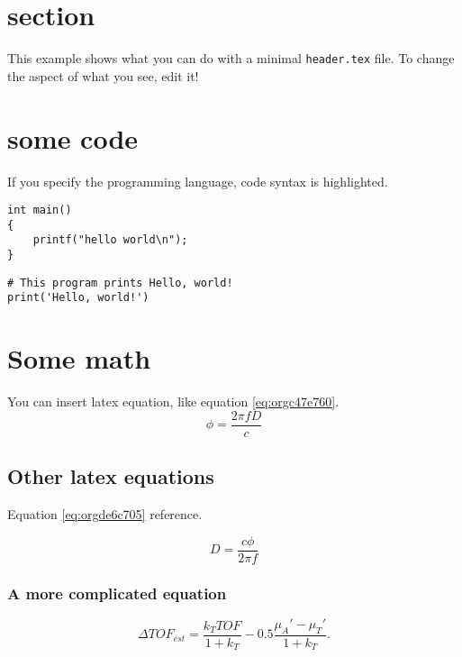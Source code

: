 


\maketitle

\newpage

\section{section}
\label{sec:org3ebf656}
This example shows what you can do with a minimal \texttt{header.tex} file.
To change the aspect of what you see, edit it!

\section{some code}
\label{sec:org30e21d0}
If you specify the programming language, code syntax is highlighted.
\begin{verbatim}
int main()
{
    printf("hello world\n");
}
\end{verbatim}

\begin{verbatim}
# This program prints Hello, world!
print('Hello, world!')
\end{verbatim}

\section{Some math}
\label{sec:org62c0d26}
You can insert latex equation, like equation \ref{eq:orgc47e760}.
\begin{equation}
\label{eq:orgc47e760}
\phi = \frac{2\pi fD}{c}
\end{equation}
\subsection{Other latex equations}
\label{sec:orgd1080d2}
Equation \ref{eq:orgde6c705} reference.

\begin{equation}
\label{eq:orgde6c705}
D = \frac{c\phi}{2\pi f}
\end{equation}

\subsubsection{A more complicated equation}
\label{sec:org3a9eafa}

\begin{equation}
\Delta TOF_{est} = \frac{k_T TOF}{1+k_T } - 0.5 \frac{\mu_A' - \mu_T'}{1+k_T}.
\end{equation}

